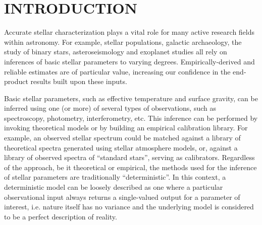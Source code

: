\documentclass[apjl]{emulateapj}
\begin{document}


\section{INTRODUCTION}
\label{sec:intro}


Accurate stellar characterization plays a vital role for many active research
fields within astronomy. For example, stellar populations, galactic
archaeology, the study of binary stars, asteroseismology and exoplanet studies
all rely on inferences of basic stellar parameters to varying degrees.
Empirically-derived and reliable estimates are of particular value, increasing
our confidence in the end-product results built upon these inputs.

Basic stellar parameters, such as effective temperature and surface gravity,
can be inferred using one (or more) of several types of observations, such as
spectroscopy, photometry, interferometry, etc. This inference can be performed
by invoking theoretical models or by building an empirical calibration
library.
For example, an observed stellar spectrum could be matched against a library of
theoretical spectra generated using stellar atmosphere models, or, against a
library of observed spectra of ``standard stars'', serving as calibrators.
Regardless of the approach, be it theoretical or empirical, the methods used
for the inference of stellar parameters are traditionally ``deterministic''.
In this context, a deterministic model can be loosely described as one where
a particular observational input always returns a single-valued output for a
parameter of interest, i.e. nature itself has no variance and the underlying
model is considered to be a perfect description of reality.
\end{document}
